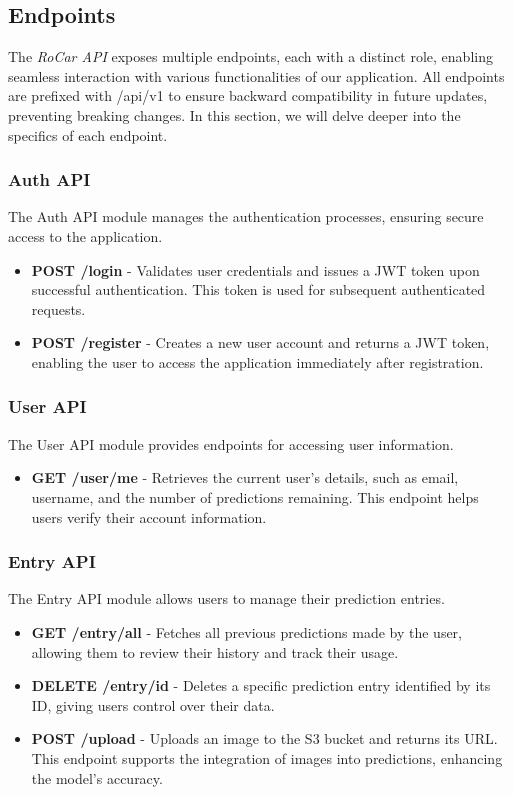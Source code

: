 \subsection{Endpoints}
The \textit{RoCar API} exposes multiple endpoints, each with a distinct role, enabling seamless interaction with various functionalities of our application. All endpoints are prefixed with /api/v1 to ensure backward compatibility in future updates, preventing breaking changes. In this section, we will delve deeper into the specifics of each endpoint.

\subsubsection{Auth API}
The Auth API module manages the authentication processes, ensuring secure access to the application.
\begin{itemize}
\item \textbf{POST /login} - Validates user credentials and issues a JWT token upon successful authentication. This token is used for subsequent authenticated requests.
\item \textbf{POST /register} - Creates a new user account and returns a JWT token, enabling the user to access the application immediately after registration.
\end{itemize}

\subsubsection{User API}
The User API module provides endpoints for accessing user information.
\begin{itemize}
\item \textbf{GET /user/me} - Retrieves the current user's details, such as email, username, and the number of predictions remaining. This endpoint helps users verify their account information.
\end{itemize}

\subsubsection{Entry API}
The Entry API module allows users to manage their prediction entries.
\begin{itemize}
\item \textbf{GET /entry/all} - Fetches all previous predictions made by the user, allowing them to review their history and track their usage.
\item \textbf{DELETE /entry/{id}} - Deletes a specific prediction entry identified by its ID, giving users control over their data.
\item \textbf{POST /upload} - Uploads an image to the S3 bucket and returns its URL. This endpoint supports the integration of images into predictions, enhancing the model's accuracy.
\end{itemize}

